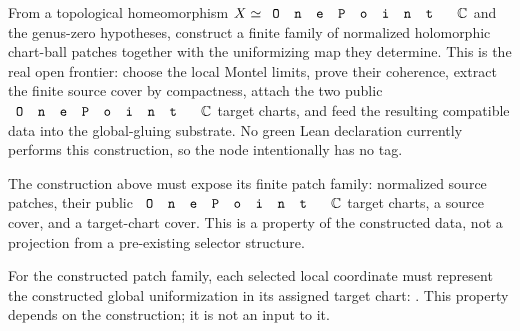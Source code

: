 \begin{lemma}
\label{lem:montel-selector-finite-patch-family-assembly}
From a topological homeomorphism \(X\simeq\code{OnePoint}\,\C\) and the
genus-zero hypotheses, construct a finite family of normalized holomorphic
chart-ball patches together with the uniformizing map they determine. This is
the real open frontier: choose the local Montel limits, prove their coherence,
extract the finite source cover by compactness, attach the two public
\(\code{OnePoint}\,\C\) target charts, and feed the resulting compatible data
into the global-gluing substrate. No green Lean declaration currently performs
this construction, so the node intentionally has no 
tag.
\end{lemma}

\begin{lemma}
\label{lem:montel-selector-patch-family-extraction}
The construction above must expose its finite patch family: normalized source
patches, their public \(\code{OnePoint}\,\C\) target charts, a source cover, and
a target-chart cover. This is a property of the constructed data, not a
projection from a pre-existing selector structure.
\end{lemma}

\begin{lemma}
\label{lem:montel-selector-coord-represents-uniformization}
For the constructed patch family, each selected local coordinate must represent
the constructed global uniformization in its assigned target chart:
. This property depends on
the construction; it is not an input to it.
\end{lemma}

